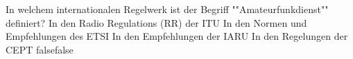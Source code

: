     {In welchem internationalen Regelwerk ist der Begriff ""Amateurfunkdienst"" definiert?}
    {In den Radio Regulations (RR) der ITU }
    {In den Normen und Empfehlungen des ETSI }
    {In den Empfehlungen der IARU }
    {In den Regelungen der CEPT }
    {false}{false}